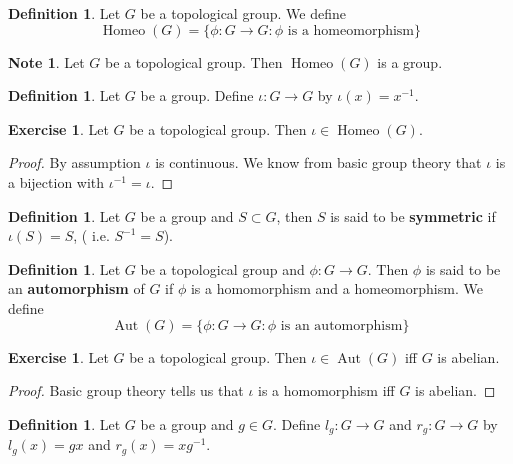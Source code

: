 \documentclass[12pt]{amsart}
\theoremstyle{definition}
\newtheorem{defn}[definition]{Definition}
\newtheorem{note}[definition]{Note}
\newtheorem{ex}[definition]{Exercise}
\DeclareMathOperator{\Aut}{Aut}
\DeclareMathOperator{\Homeo}{Homeo}
\newcommand{\lex}[1]{\label{ex:#1}}
\newcommand{\ld}[1]{\label{defn:#1}}
\begin{document}
	\begin{defn} \ld{00000} 
		Let $G$ be a topological group. We define $$\Homeo(G) = \{\phi:G \rightarrow G: \phi \text{ is a homeomorphism}\}$$
	\end{defn}
	
	\begin{note}
	Let $G$ be a topological group. Then $\Homeo(G)$ is a group.
	\end{note}
	
	\begin{defn} \ld{00000} 
		Let $G$ be a group. Define $\iota:G \rightarrow G$ by $\iota(x) = x^{-1}$. 
	\end{defn}
	
	\begin{ex} \lex{00000} 
		Let $G$ be a topological group. Then $\iota \in \Homeo(G)$.
	\end{ex}

	\begin{proof}
		By assumption $\iota$ is continuous. We know from basic group theory that $\iota$ is a bijection with $\iota^{-1} = \iota$. 
	\end{proof}

	\begin{defn} \ld{00000} 
		Let $G$ be a group and $S \subset G$, then $S$ is said to be \textbf{symmetric} if $\iota(S) = S$, ( i.e. $S^{-1} = S$).
	\end{defn}
	
	\begin{defn} \ld{00000} 
		Let $G$ be a topological group and $\phi:G \rightarrow G$. Then $\phi$ is said to be an \textbf{automorphism} of $G$ if $\phi$ is a homomorphism and a homeomorphism. We define $$\Aut(G) = \{\phi:G \rightarrow G: \phi \text{ is an automorphism}\}$$
	\end{defn}
	
	\begin{ex} \lex{00000} 
	Let $G$ be a topological group. Then $\iota \in \Aut(G)$ iff $G$ is abelian. 
	\end{ex}
	
	\begin{proof}
	Basic group theory tells us that $\iota$ is a homomorphism iff $G$ is abelian.
	\end{proof}
	
	\begin{defn} \ld{00000} 
		Let $G$ be a group and $g \in G$. Define $l_g:G \rightarrow G$ and $r_g:G \rightarrow G$ by $l_g(x) = gx$ and $r_g(x) = xg^{-1}$. 
	\end{defn}
	
\end{document}
